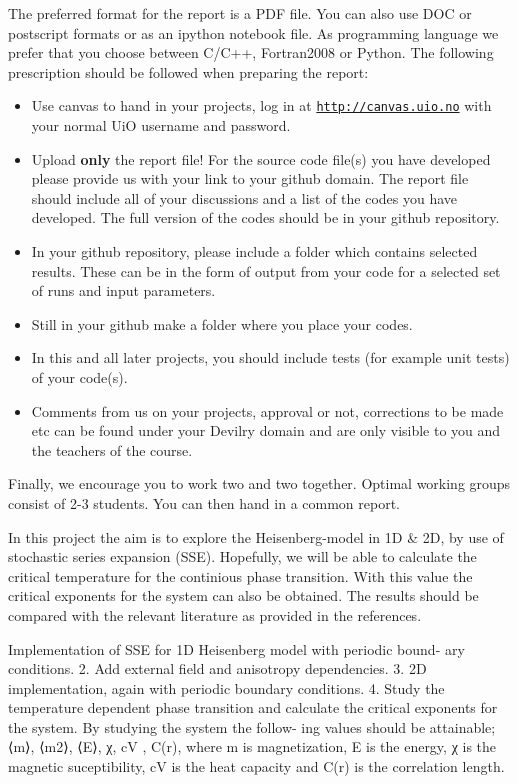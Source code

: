 \documentclass[%
oneside,                 %
final,                   %
10pt]{article}
\begin{document}
The preferred format for the report is a PDF file. You can also use DOC or postscript formats or as an ipython notebook file.  As programming language we prefer that you choose between C/C++, Fortran2008 or Python. The following prescription should be followed when preparing the report:

\begin{itemize}
  \item Use canvas to hand in your projects, log in  at  \href{{http://canvas.uio.no}}{\nolinkurl{http://canvas.uio.no}} with your normal UiO username and password.

  \item Upload \textbf{only} the report file!  For the source code file(s) you have developed please provide us with your link to your github domain.  The report file should include all of your discussions and a list of the codes you have developed.  The full version of the codes should be in your github repository.

  \item In your github repository, please include a folder which contains selected results. These can be in the form of output from your code for a selected set of runs and input parameters.

  \item Still in your github make a folder where you place your codes. 

  \item In this and all later projects, you should include tests (for example unit tests) of your code(s).

  \item Comments  from us on your projects, approval or not, corrections to be made  etc can be found under your Devilry domain and are only visible to you and the teachers of the course.
\end{itemize}

\noindent
Finally, 
we encourage you to work two and two together. Optimal working groups consist of 
2-3 students. You can then hand in a common report. 

In this project the aim is to explore the Heisenberg-model in 1D {\&} 2D, by use of stochastic series expansion (SSE). Hopefully, we will be able to calculate the critical temperature for the continious phase transition. With this value the critical exponents for the system can also be obtained.
The results should be compared with the relevant literature as provided in the references.

Implementation of SSE for 1D Heisenberg model with periodic bound- ary conditions.
2. Add external field and anisotropy dependencies.
3. 2D implementation, again with periodic boundary conditions.
4. Study the temperature dependent phase transition and calculate the critical exponents for the system. By studying the system the follow- ing values should be attainable; ⟨m⟩, ⟨m2⟩, ⟨E⟩, χ, cV , C(r), where m is magnetization, E is the energy, χ is the magnetic suceptibility, cV is the heat capacity and C(r) is the correlation length.



\end{document}
